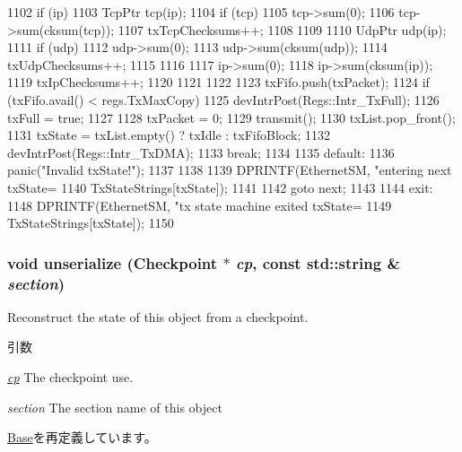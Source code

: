 \begin{DoxyCode}
{{{1102             if (ip) {
1103                 TcpPtr tcp(ip);
1104                 if (tcp) {
1105                     tcp->sum(0);
1106                     tcp->sum(cksum(tcp));
1107                     txTcpChecksums++;
1108                 }
1109 
1110                 UdpPtr udp(ip);
1111                 if (udp) {
1112                     udp->sum(0);
1113                     udp->sum(cksum(udp));
1114                     txUdpChecksums++;
1115                 }
1116 
1117                 ip->sum(0);
1118                 ip->sum(cksum(ip));
1119                 txIpChecksums++;
1120             }
1121         }
1122 
1123         txFifo.push(txPacket);
1124         if (txFifo.avail() < regs.TxMaxCopy) {
1125             devIntrPost(Regs::Intr_TxFull);
1126             txFull = true;
1127         }
1128         txPacket = 0;
1129         transmit();
1130         txList.pop_front();
1131         txState = txList.empty() ? txIdle : txFifoBlock;
1132         devIntrPost(Regs::Intr_TxDMA);
1133         break;
1134 
1135       default:
1136         panic("Invalid txState!");
1137     }
1138 
1139     DPRINTF(EthernetSM, "entering next txState=%
1140             TxStateStrings[txState]);
1141 
1142     goto next;
1143 
1144   exit:
1148     DPRINTF(EthernetSM, "tx state machine exited txState=%
1149             TxStateStrings[txState]);
1150 }
\end{DoxyCode}
\hypertarget{classSinic_1_1Device_af22e5d6d660b97db37003ac61ac4ee49}{
\subsubsection[{unserialize}]{\setlength{\rightskip}{0pt plus 5cm}void unserialize ({\bf Checkpoint} $\ast$ {\em cp}, \/  const std::string \& {\em section})}}
\label{classSinic_1_1Device_af22e5d6d660b97db37003ac61ac4ee49}
Reconstruct the state of this object from a checkpoint. 
\begin{DoxyParams}{引数}
\item[{\em \hyperlink{namespacecp}{cp}}]The checkpoint use. \item[{\em section}]The section name of this object \end{DoxyParams}


\hyperlink{classSinic_1_1Base_af22e5d6d660b97db37003ac61ac4ee49}{Base}を再定義しています。


